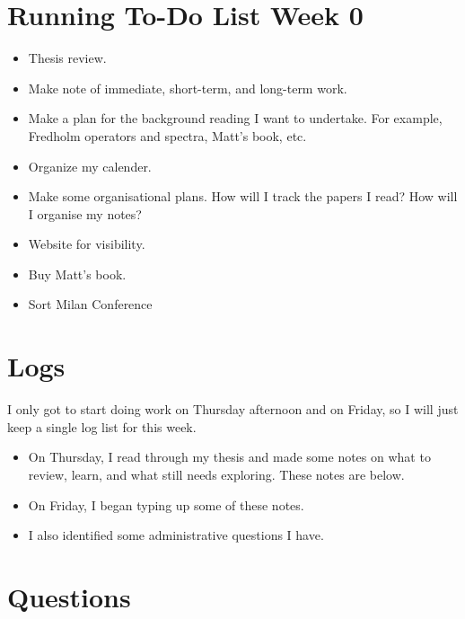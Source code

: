 \documentclass[12pt,a4paper]{article}
\begin{document}
\section{Running To-Do List Week 0}

\begin{itemize}
    \item Thesis review. 
    \item Make note of immediate, short-term, and long-term work. 
    \item Make a plan for the background reading I want to undertake. For example, Fredholm operators and spectra, Matt's book, etc. 
    \item Organize my calender.
    \item Make some organisational plans. How will I track the papers I read? How will I organise my notes? 
    \item Website for visibility.
    \item Buy Matt's book. 
    \item Sort Milan Conference
\end{itemize}

\section{Logs}

I only got to start doing work on Thursday afternoon and on Friday, so I will just keep a single log list for this week. 

\begin{itemize}
    \item On Thursday, I read through my thesis and made some notes on what to review, learn, and what still needs exploring. These notes are below.
    \item On Friday, I began typing up some of these notes. 
    \item I also identified some administrative questions I have. 
\end{itemize}


\section{Questions}
\end{document}
